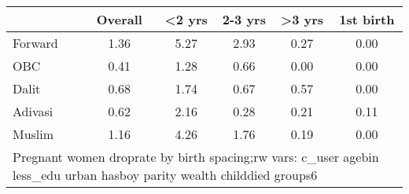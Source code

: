 \begin{tabular}{l*{5}{c}}
\toprule
            &\multicolumn{1}{c}{Overall}&\multicolumn{1}{c}{<2 yrs}&\multicolumn{1}{c}{2-3 yrs}&\multicolumn{1}{c}{>3 yrs}&\multicolumn{1}{c}{1st birth}\\
\midrule
\midrule
Forward     &        1.36&        5.27&        2.93&        0.27&        0.00\\
OBC         &        0.41&        1.28&        0.66&        0.00&        0.00\\
Dalit       &        0.68&        1.74&        0.67&        0.57&        0.00\\
Adivasi     &        0.62&        2.16&        0.28&        0.21&        0.11\\
Muslim      &        1.16&        4.26&        1.76&        0.19&        0.00\\
\bottomrule
\multicolumn{6}{l}{\footnotesize Pregnant women droprate by birth spacing;\n rw vars: c\_user agebin less\_edu urban hasboy parity wealth childdied groups6}\\
\end{tabular}
